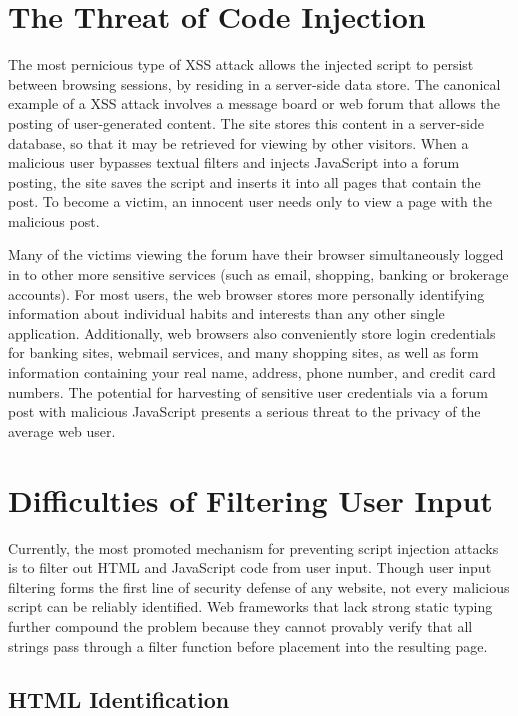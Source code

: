 \section{The Threat of Code Injection}

The most pernicious type of XSS attack allows the injected script to persist between browsing sessions, by residing in a server-side data store.
The canonical example of a  XSS attack involves a message board or web forum that allows the posting of user-generated content.
The site stores this content in a server-side database, so that it may be retrieved for viewing by other visitors.
When a malicious user bypasses textual filters and injects JavaScript into a forum posting, the site saves the script and inserts it into all pages that contain the post.
To become a victim, an innocent user needs only to view a page with the malicious post.

Many of the victims viewing the forum have their browser simultaneously logged in to other more sensitive services (such as email, shopping, banking or brokerage accounts).
For most users, the web browser stores more personally identifying information about individual habits and interests than any other single application.
Additionally, web browsers also conveniently store login credentials for banking sites, webmail services, and many shopping sites, as well as form information containing your real name, address, phone number, and credit card numbers.
The potential for harvesting of sensitive user credentials via a forum post with malicious JavaScript presents a serious threat to the privacy of the average web user.

\section{Difficulties of Filtering User Input}

Currently, the most promoted mechanism for preventing script injection attacks is to filter out HTML and JavaScript code from user input.
Though user input filtering forms the first line of security defense of any website, not every malicious script can be reliably identified.
Web frameworks that lack strong static typing further compound the problem because they cannot provably verify that all strings pass through a filter function before placement into the resulting page.

\subsection{HTML Identification}
\label{subsec:html-encoding}


